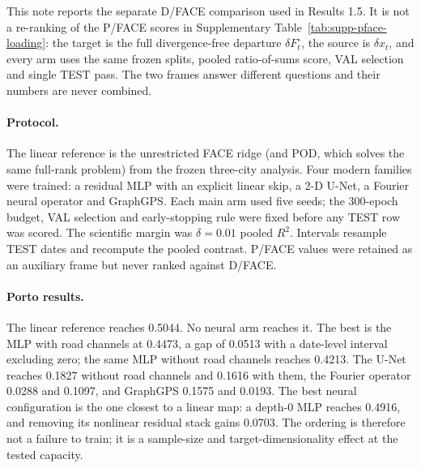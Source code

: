 
This note reports the separate D/FACE comparison used in Results 1.5. It is not a re-ranking of the P/FACE scores in Supplementary Table~\ref{tab:supp-pface-loading}: the target is the full divergence-free departure $\delta F_t^\circ$, the source is $\delta x_t$, and every arm uses the same frozen splits, pooled ratio-of-sums score, VAL selection and single TEST pass. The two frames answer different questions and their numbers are never combined.

\paragraph{Protocol.} The linear reference is the unrestricted FACE ridge (and POD, which solves the same full-rank problem) from the frozen three-city analysis. Four modern families were trained: a residual MLP with an explicit linear skip, a 2-D U-Net, a Fourier neural operator and GraphGPS. Each main arm used five seeds; the 300-epoch budget, VAL selection and early-stopping rule were fixed before any TEST row was scored. The scientific margin was $\delta=0.01$ pooled $R^2$. Intervals resample TEST dates and recompute the pooled contrast. P/FACE values were retained as an auxiliary frame but never ranked against D/FACE.

\paragraph{Porto results.} The linear reference reaches 0.5044. No neural arm reaches it. The best is the MLP with road channels at 0.4473, a gap of 0.0513 with a date-level interval excluding zero; the same MLP without road channels reaches 0.4213. The U-Net reaches 0.1827 without road channels and 0.1616 with them, the Fourier operator 0.0288 and 0.1097, and GraphGPS 0.1575 and 0.0193. The best neural configuration is the one closest to a linear map: a depth-0 MLP reaches 0.4916, and removing its nonlinear residual stack gains 0.0703. The ordering is therefore not a failure to train; it is a sample-size and target-dimensionality effect at the tested capacity.

